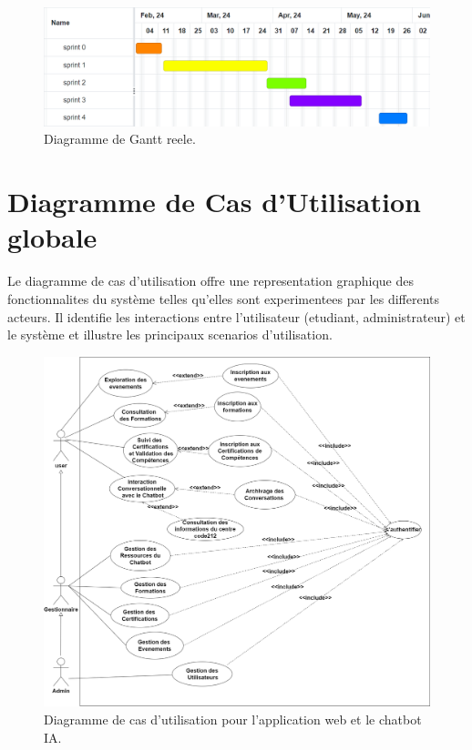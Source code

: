 \documentclass[a4paper, 11pt, openany]{report}
\begin{document}
\begin{figure}[h!]
\centering
\includegraphics[width=\textwidth]{gantt-reel.png}
\caption{Diagramme de Gantt reele.}
\label{fig:reel-gantt}
\end{figure}
\clearpage
\section{Diagramme de Cas d'Utilisation globale}
Le diagramme de cas d'utilisation offre une representation graphique des fonctionnalites du système telles qu'elles sont experimentees par les differents acteurs. Il identifie les interactions entre l'utilisateur (etudiant, administrateur) et le système et illustre les principaux scenarios d'utilisation. 
\clearpage

\begin{figure}[h!]

\centering
\includegraphics[width=\textwidth]{images/usecase.png}
\caption{Diagramme de cas d'utilisation pour l'application web et le chatbot IA.}
\label{fig:use_case_diagram}
\end{figure}
\end{document}
